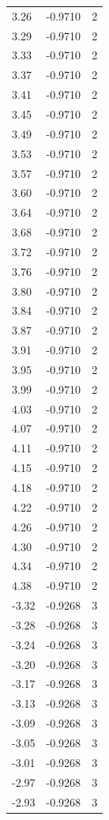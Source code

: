 \begin{longtable}{lrr}
  3.26 & -0.9710 & 2 \\
  3.29 & -0.9710 & 2 \\
  3.33 & -0.9710 & 2 \\
  3.37 & -0.9710 & 2 \\
  3.41 & -0.9710 & 2 \\
  3.45 & -0.9710 & 2 \\
  3.49 & -0.9710 & 2 \\
  3.53 & -0.9710 & 2 \\
  3.57 & -0.9710 & 2 \\
  3.60 & -0.9710 & 2 \\
  3.64 & -0.9710 & 2 \\
  3.68 & -0.9710 & 2 \\
  3.72 & -0.9710 & 2 \\
  3.76 & -0.9710 & 2 \\
  3.80 & -0.9710 & 2 \\
  3.84 & -0.9710 & 2 \\
  3.87 & -0.9710 & 2 \\
  3.91 & -0.9710 & 2 \\
  3.95 & -0.9710 & 2 \\
  3.99 & -0.9710 & 2 \\
  4.03 & -0.9710 & 2 \\
  4.07 & -0.9710 & 2 \\
  4.11 & -0.9710 & 2 \\
  4.15 & -0.9710 & 2 \\
  4.18 & -0.9710 & 2 \\
  4.22 & -0.9710 & 2 \\
  4.26 & -0.9710 & 2 \\
  4.30 & -0.9710 & 2 \\
  4.34 & -0.9710 & 2 \\
  4.38 & -0.9710 & 2 \\
  -3.32 & -0.9268 & 3 \\
  -3.28 & -0.9268 & 3 \\
  -3.24 & -0.9268 & 3 \\
  -3.20 & -0.9268 & 3 \\
  -3.17 & -0.9268 & 3 \\
  -3.13 & -0.9268 & 3 \\
  -3.09 & -0.9268 & 3 \\
  -3.05 & -0.9268 & 3 \\
  -3.01 & -0.9268 & 3 \\
  -2.97 & -0.9268 & 3 \\
  -2.93 & -0.9268 & 3 \\

\end{longtable}
